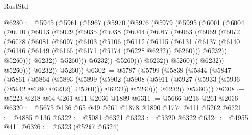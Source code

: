 \begin{lexlean}{RustStd}
\begin{coremodule}
{\begin{coremodule}
{{{{{{{{{{{{{{{{{{{{{{{{{{{{{@6280 := @5945
    (@5961
      (@5967
        (@5970
          (@5976
            (@5979
              (@5995
                (@6001
                  (@6004
                    (@6010
                      (@6013
                        (@6029
                          (@6035
                            (@6038
                              (@6044
                                (@6047
                                  (@6063
                                    (@6069
                                      (@6072
                                        (@6078
                                          (@6081
                                            (@6097
                                              (@6103
                                                (@6106
                                                  (@6112
                                                    (@6115
                                                      (@6131
                                                        (@6137
                                                          (@6140
                                                            (@6146
                                                              (@6149
                                                                (@6165
                                                                  (@6171
                                                                    (@6174 (@6228 @6232))
                                                                    @5260)))
                                                              @6232))
                                                          @5260)))
                                                    @6232))
                                                @5260)))
                                          @6232))
                                      @5260)))
                                @6232))
                            @5260)))
                      @6232))
                  @5260)))
            @6232))
        @5260))
@6302 := @5787
    (@5799
      (@5838
        (@5844
          (@5847
            (@5861
              (@5864
                (@5893
                  (@5899
                    (@5902 (@5908 (@5911 (@5927 (@5933 (@5936 (@5942 @6280 @6232)) @5260))) @6232))
                    @5260)))
              @6232))
          @5260)))
@6308 := @5223 @218 @64 @261 @11 @2036 @1889
@6311 := @5666 @218 @261 @2036
@6320 := @5675 @136 @65 @49 @261 @1878 @1890 @1774 @411 @5262
@6321 := @4885 @136
@6322 := @5081 @6321
@6323 := @6320 @6322
@6324 := @4955 @411
@6326 := @6323 (@5267 @6324)
}}}}}}}}}}}}}}}}}}}}}}}}}}}}}
\end{coremodule}}
\end{coremodule}
\end{lexlean}
